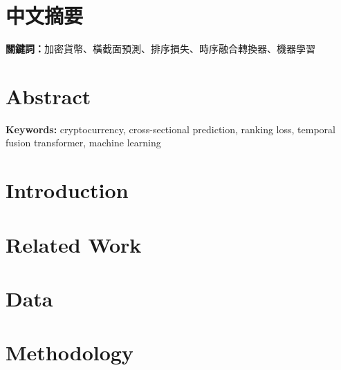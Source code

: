 \documentclass[12pt, a4paper, oneside]{book}
\begin{document}
\chapter*{中文摘要}
\thispagestyle{plain}

\begin{singlespace}

\end{singlespace}

\vspace{1em}
\noindent\textbf{關鍵詞：}加密貨幣、橫截面預測、排序損失、時序融合轉換器、機器學習

\chapter*{Abstract}
\thispagestyle{plain}



\vspace{1em}
\noindent\textbf{Keywords:} cryptocurrency, cross-sectional prediction, ranking loss,
temporal fusion transformer, machine learning

\tableofcontents
\listoffigures
\listoftables

\mainmatter

\chapter{Introduction}
\label{sec:intro}


\chapter{Related Work}
\label{sec:related}


\chapter{Data}
\label{sec:data}


\chapter{Methodology}
\label{sec:method}

\end{document}
